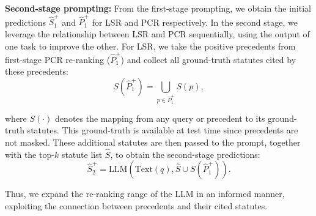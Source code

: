 \vspace{-1mm}
\noindent\textbf{Second-stage prompting:} 
From the first-stage prompting, we obtain the initial predictions $\hat S_1^+$ and $\hat P_1^+$ for LSR and PCR respectively.  
In the second stage, we leverage the relationship between LSR and PCR sequentially, using the output of one task to improve the other. For LSR, we take the positive precedents from first-stage PCR re-ranking ($\hat P_1^+$) and collect all ground-truth statutes cited by these precedents:
\vspace{-2mm}
\[
S(\hat P_1^+) = \bigcup_{p \in \hat P_1^+} S(p),
\]

\vspace{-2mm}
\noindent where $S(\cdot)$ denotes the mapping from any query or precedent to its ground-truth statutes. This ground-truth is available at test time since precedents are not masked.  
These additional statutes are then passed to the prompt, together with the top-$k$ statute list $\hat S$, to obtain the second-stage predictions:
\vspace{-2mm}
\[
\hat S_2^+ = \textrm{LLM}(\textrm{Text}(q), \hat S \cup S(\hat P_1^+)).
\]

\vspace{-1mm}
\noindent Thus, we expand the re-ranking range of the LLM in an informed manner, exploiting the connection between precedents and their cited statutes.


